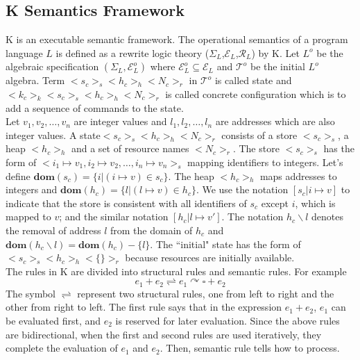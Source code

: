 \documentclass{lmcs} %
\theoremstyle{plain}\newtheorem{satz}[thm]{Satz} %
\begin{document}
\subsection*{K Semantics Framework}
K is an executable semantic framework. The operational semantics of a program language $L$ is defined as a rewrite logic theory ($\Sigma_L$,$\mathcal{E}_L$,$\mathcal{R}_L$)\cite{marti1996rewriting} by K. Let $L^o$ be the algebraic specification $(\Sigma_L,\mathcal{E}_L^o)$ where $\mathcal{E}_L^o\subseteq \mathcal{E}_L$ and $\mathcal{T}^o$ be the initial $L^o$ algebra. Term $<\!\!s_c\!\!>_s<\!\!h_c\!\!>_h<\!\!N_c\!\!>_r$ in $\mathcal{T}^o$ is called state and $<\!\!k_c\!\!>_k<\!\!s_c\!\!>_s<\!\!h_c\!\!>_h<\!\!N_c\!\!>_r$ is called concrete configuration which is to add a sequence of commands to the state.\\
Let $v_1,v_2,\ldots,v_n$ are integer values and $l_1,l_2,\ldots,l_n$ are addresses which are also integer values.
A state$<\!\!s_c\!\!>_s<\!\!h_c\!\!>_h<\!\!N_c\!\!>_r$ consists of a store $<\!\!s_c\!\!>_s$, a heap $<\!\!h_c\!\!>_h$ and a set of resource names $<\!\!N_c\!\!>_r$. The store $<\!\!s_c\!\!>_s$ has the form of $<\!\!i_1\mapsto v_1,i_2\mapsto v_2,\ldots,i_n\mapsto v_n\!\!>_s$
mapping identifiers to integers. Let's define $\mathbf{dom}(s_c)=\{i| (i\mapsto v)\in s_c\}$. The heap $<\!\!h_c\!\!>_h$ maps addresses to integers and $\mathbf{dom}(h_c)=\{l| (l\mapsto v)\in h_c\}$. We use the notation $[s_c|i\mapsto v]$ to indicate that the store is consistent with all identifiers of $s_c$ except $i$, which is mapped to $v$; and the similar notation $[h_c|l\mapsto v']$. The notation $h_c\backslash l$ denotes the removal of address $l$ from the domain of $h_c$ and $\mathbf{dom}(h_c\backslash l)=\mathbf{dom}(h_c)-\{l\}$. The ``initial" state has the form of $<\!\!s_c\!\!>_s<\!\!h_c\!\!>_h<\!\!\{\}\!\!>_r$ because resources are initially available.\\
The rules in K are divided into structural rules and semantic rules. For example
$$e_1+e_2\rightleftharpoons e_1\curvearrowright \square + e_2$$
The symbol $\rightleftharpoons$ represent two structural rules, one from left to right and the other from
right to left. The first rule says that in the expression $e_1+e_2$, $e_1$ can be evaluated first, and $e_2$ is reserved for later evaluation. Since the above rules are bidirectional, when the first and second rules are used iteratively, they complete the evaluation of $e_1$ and $e_2$. Then, semantic rule tells how to process.
\end{document}
